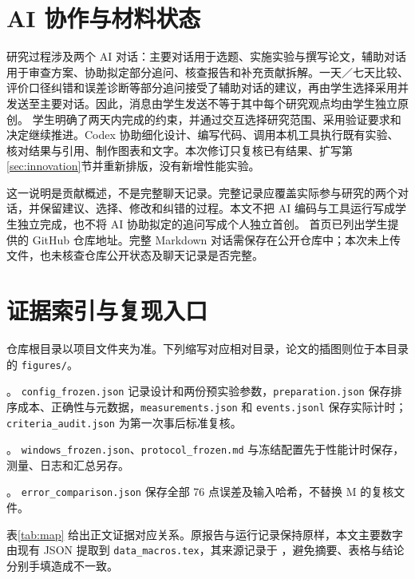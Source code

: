 \documentclass[UTF8,a4paper,zihao=-4,fontset=none]{ctexart}
\newcommand{\code}[1]{{\small\texttt{#1}}}
\begin{document}
\FloatBarrier
\clearpage
\printbibliography[heading=bibintoc,title={参考文献}]

\appendix
\section{AI 协作与材料状态}
\label{app:ai}
研究过程涉及两个 AI 对话：主要对话用于选题、实施实验与撰写论文，辅助对话用于审查方案、协助拟定部分追问、核查报告和补充贡献拆解。一天／七天比较、评价口径纠错和误差诊断等部分追问接受了辅助对话的建议，再由学生选择采用并发送至主要对话。因此，消息由学生发送不等于其中每个研究观点均由学生独立原创。
学生明确了两天内完成的约束，并通过交互选择研究范围、采用验证要求和决定继续推进。Codex 协助细化设计、编写代码、调用本机工具执行既有实验、核对结果与引用、制作图表和文字。本次修订只复核已有结果、扩写第\ref{sec:innovation}节并重新排版，没有新增性能实验。

这一说明是贡献概述，不是完整聊天记录。完整记录应覆盖实际参与研究的两个对话，并保留建议、选择、修改和纠错的过程。本文不把 AI 编码与工具运行写成学生独立完成，也不将 AI 协助拟定的追问写成个人独立首创。
首页已列出学生提供的 GitHub 仓库地址。完整 Markdown 对话需保存在公开仓库中；本次未上传文件，也未核查仓库公开状态及聊天记录是否完整。

\section{证据索引与复现入口}
\label{app:evidence}
仓库根目录以项目文件夹为准。下列缩写对应相对目录，论文的插图则位于本目录的 \code{figures/}。
\begin{description}[leftmargin=2em,style=nextline]
\item[M：主实验] 。
\code{config\_frozen.json} 记录设计和两份预实验参数，\code{preparation.json} 保存排序成本、正确性与元数据，\code{measurements.json} 和 \code{events.jsonl} 保存实际计时；\code{criteria\_audit.json} 为第一次事后标准复核。
\item[S：补充实验] 。
\code{windows\_frozen.json}、\code{protocol\_frozen.md} 与冻结配置先于性能计时保存，测量、日志和汇总另存。
\item[P：第二次事后分析] 。
\code{error\_comparison.json} 保存全部 76 点误差及输入哈希，不替换 M 的复核文件。
\end{description}

表\ref{tab:map} 给出正文证据对应关系。原报告与运行记录保持原样，本文主要数字由现有 JSON 提取到 \code{data\_macros.tex}，其来源记录于 ，避免摘要、表格与结论分别手填造成不一致。
\end{document}
